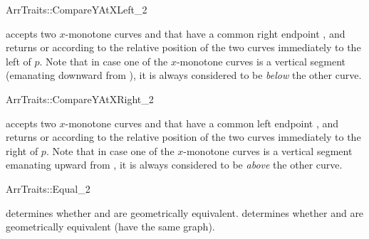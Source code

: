 \ccRefPageBegin
\begin{ccRefConcept}{ArrTraits::CompareYAtXLeft_2}

\ccHasModels{}

  {accepts two $x$-monotone curves  and 
  that have a common right endpoint , and returns  or  according to the relative position of the two
  curves immediately to the left of $p$. Note that in case one of the
  $x$-monotone curves is a vertical segment (emanating downward from
  ), it is always considered to be {\sl below} the other curve.}
\end{ccRefConcept}
\ccRefPageEnd

\ccRefPageBegin
\begin{ccRefConcept}{ArrTraits::CompareYAtXRight_2}

\ccHasModels{}

  {accepts two $x$-monotone curves  and 
  that have a common left endpoint , and returns  or  according to the relative position of the two
  curves immediately to the right of $p$. Note that in case one of the
  $x$-monotone curves is a vertical segment emanating upward from
  , it is always considered to be {\sl above} the other curve.}
\end{ccRefConcept}
\ccRefPageEnd

\ccRefPageBegin
\begin{ccRefConcept}{ArrTraits::Equal_2}

\ccHasModels{}

  {determines whether  and  are geometrically 
  equivalent.}
\ccGlue
{}
  {determines whether  and  are
  geometrically equivalent (have the same graph).}
\end{ccRefConcept}
\ccRefPageEnd

